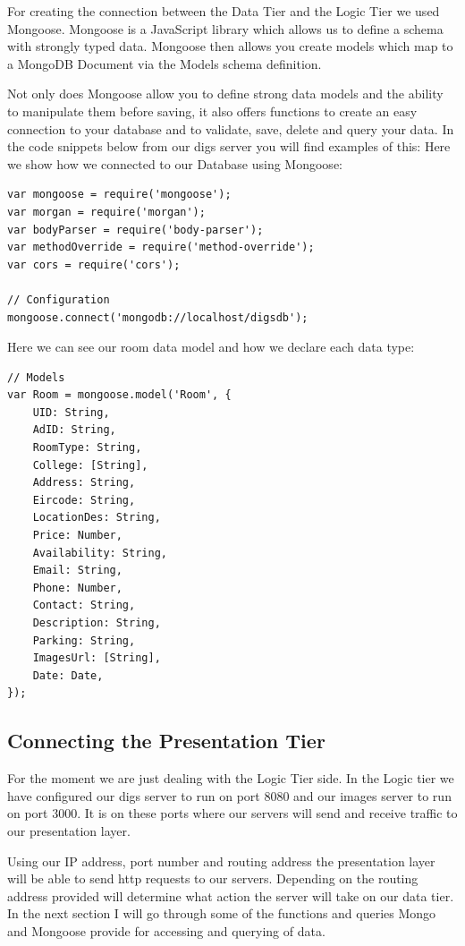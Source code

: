 For creating the connection between the Data Tier and the Logic Tier we used Mongoose. Mongoose is a JavaScript library which allows us to define a schema with strongly typed data. Mongoose then allows you create models which map to a MongoDB Document via the Models schema definition.\cite{Mongoose}

Not only does Mongoose allow you to define strong data models and the ability to manipulate them before saving, it also offers functions to create an easy connection to your database and to validate, save, delete and query your data. In the code snippets below from our digs server you will find examples of this:
Here we show how we connected to our Database using Mongoose:

\begin{verbatim}
var mongoose = require('mongoose');     
var morgan = require('morgan');             
var bodyParser = require('body-parser');    
var methodOverride = require('method-override'); 
var cors = require('cors');
 
// Configuration
mongoose.connect('mongodb://localhost/digsdb');
\end{verbatim}

\noindent Here we can see our room data model and how we declare each data type:

\begin{verbatim}
// Models
var Room = mongoose.model('Room', {
    UID: String,
    AdID: String,
    RoomType: String,
	College: [String],
	Address: String,
    Eircode: String,
    LocationDes: String,
    Price: Number,
    Availability: String,
    Email: String,
    Phone: Number,
    Contact: String,
    Description: String,
    Parking: String,
	ImagesUrl: [String],
	Date: Date,
});
\end{verbatim}

\subsection{Connecting the Presentation Tier}

For the moment we are just dealing with the Logic Tier side. In the Logic tier we have configured our digs server to run on port 8080 and our images server to run on port 3000. It is on these ports where our servers will send and receive traffic to our presentation layer.

Using our IP address, port number and routing address the presentation layer will be able to send http requests to our servers. Depending on the routing address provided will determine what action the server will take on our data tier. In the next section I will go through some of the functions and queries Mongo and Mongoose provide for accessing and querying of data.

